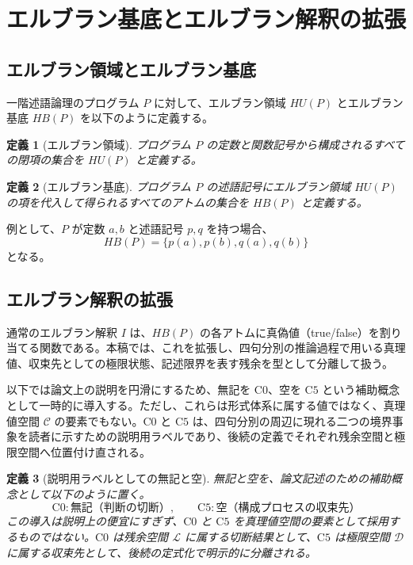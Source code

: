 \documentclass[11pt,a4paper]{article}
\newtheorem{definition}{定義}
\newcommand{\HB}{\mathit{HB}}
\newcommand{\HU}{\mathit{HU}}
\newcommand{\C}{\mathcal{C}}
\newcommand{\Lspace}{\mathcal{L}}
\newcommand{\Czero}{\text{C0}}
\newcommand{\Cfive}{\text{C5}}
\begin{document}
\section{エルブラン基底とエルブラン解釈の拡張}
\label{sec:herbrand}

\subsection{エルブラン領域とエルブラン基底}
\label{subsec:herbrand-domain}

一階述語論理のプログラム $P$ に対して、エルブラン領域 $\HU(P)$ とエルブラン基底 $\HB(P)$ を以下のように定義する。

\begin{definition}[エルブラン領域]
プログラム $P$ の定数と関数記号から構成されるすべての閉項の集合を $\HU(P)$ と定義する。
\end{definition}

\begin{definition}[エルブラン基底]
プログラム $P$ の述語記号にエルブラン領域 $\HU(P)$ の項を代入して得られるすべてのアトムの集合を $\HB(P)$ と定義する。
\end{definition}

例として、$P$ が定数 $a, b$ と述語記号 $p, q$ を持つ場合、
\[
\HB(P) = \{p(a), p(b), q(a), q(b)\}
\]
となる。

\subsection{エルブラン解釈の拡張}
\label{subsec:herbrand-interp}

通常のエルブラン解釈 $I$ は、$\HB(P)$ の各アトムに真偽値（true/false）を割り当てる関数である。本稿では、これを拡張し、四句分別の推論過程で用いる真理値、収束先としての極限状態、記述限界を表す残余を型として分離して扱う。

以下では論文上の説明を円滑にするため、無記を $\Czero$、空を $\Cfive$ という補助概念として一時的に導入する。ただし、これらは形式体系に属する値ではなく、真理値空間 $\C$ の要素でもない。$\Czero$ と $\Cfive$ は、四句分別の周辺に現れる二つの境界事象を読者に示すための説明用ラベルであり、後続の定義でそれぞれ残余空間と極限空間へ位置付け直される。

\begin{definition}[説明用ラベルとしての無記と空]
無記と空を、論文記述のための補助概念として以下のように置く。
\[
\Czero : \text{無記（判断の切断）}, \qquad
\Cfive : \text{空（構成プロセスの収束先）}
\]
この導入は説明上の便宜にすぎず、$\Czero$ と $\Cfive$ を真理値空間の要素として採用するものではない。$\Czero$ は残余空間 $\Lspace$ に属する切断結果として、$\Cfive$ は極限空間 $\mathcal{D}$ に属する収束先として、後続の定式化で明示的に分離される。
\end{definition}
\end{document}
